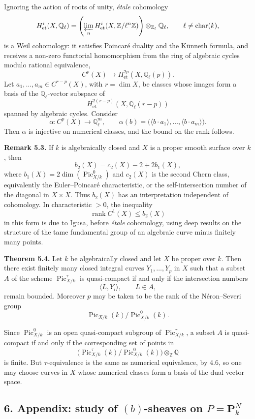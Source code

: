 \documentclass[11pt]{article}
\providecommand{\Pic}{\operatorname{Pic}}
\providecommand{\Z}{\mathbb Z}
\providecommand{\Q}{\mathbb Q}
\providecommand{\rank}{\operatorname{rank}}
\begin{document}
Ignoring the action of roots of unity, \textit{étale} cohomology
\[
   H^i_{\mathrm{et}}(X,\Q_\ell)
   =\left(\varprojlim_n H^i_{\mathrm{et}}(X,\Z/\ell^n\Z)\right)\otimes_{\Z_\ell}\Q_\ell,
   \qquad \ell\ne\operatorname{char}(k),
\]
is a Weil cohomology: it satisfies Poincar\'e duality and the K\"unneth formula, and receives a non-zero functorial homomorphism from the ring of algebraic cycles modulo rational equivalence,
\[
   C^p(X)\longrightarrow H^{2p}_{\mathrm{et}}(X,\Q_\ell(p)).
\]
Let $a_1,\ldots,a_m\in C^{r-p}(X)$, with $r=\dim X$, be classes whose images form a basis of the $\Q_\ell$-vector subspace of
\[
   H^{2(r-p)}_{\mathrm{et}}(X,\Q_\ell(r-p))
\]
spanned by algebraic cycles. Consider
\[
   \alpha:C^p(X)\longrightarrow \Q_\ell^m,
   \qquad
   \alpha(b)=\bigl(\langle b\cdot a_1\rangle,\ldots,\langle b\cdot a_m\rangle\bigr).
\]
Then $\alpha$ is injective on numerical classes, and the bound on the rank follows.

\textbf{Remark 5.3.} If $k$ is algebraically closed and $X$ is a proper smooth surface over $k$, then
\[
   b_2(X)=c_2(X)-2+2b_1(X),
\]
where $b_1(X)=2\dim(\Pic^0_{X/k})$ and $c_2(X)$ is the second Chern class, equivalently the Euler--Poincar\'e characteristic, or the self-intersection number of the diagonal in $X\times X$. Thus $b_2(X)$ has an interpretation independent of cohomology. In characteristic $>0$, the inequality
\[
   \rank C^1(X)\le b_2(X)
\]
in this form is due to Igusa, before \textit{étale} cohomology, using deep results on the structure of the tame fundamental group of an algebraic curve minus finitely many points.

\textbf{Theorem 5.4.} Let $k$ be algebraically closed and let $X$ be proper over $k$. Then there exist finitely many closed integral curves $Y_1,\ldots,Y_p$ in $X$ such that a subset $A$ of the scheme $\Pic^\tau_{X/k}$ is quasi-compact if and only if the intersection numbers
\[
   \langle L,Y_i\rangle,\qquad L\in A,
\]
remain bounded. Moreover $p$ may be taken to be the rank of the N\'eron--Severi group
\[
   \Pic_{X/k}(k)/\Pic^0_{X/k}(k).
\]

Since $\Pic^0_{X/k}$ is an open quasi-compact subgroup of $\Pic^\tau_{X/k}$, a subset $A$ is quasi-compact if and only if the corresponding set of points in
\[
   \bigl(\Pic^\tau_{X/k}(k)/\Pic^0_{X/k}(k)\bigr)\otimes_{\Z}\Q
\]
is finite. But $\tau$-equivalence is the same as numerical equivalence, by 4.6, so one may choose curves in $X$ whose numerical classes form a basis of the dual vector space.

\subsection*{6. Appendix: study of $(b)$-sheaves on $P=\mathbf P^N_k$}
\end{document}
